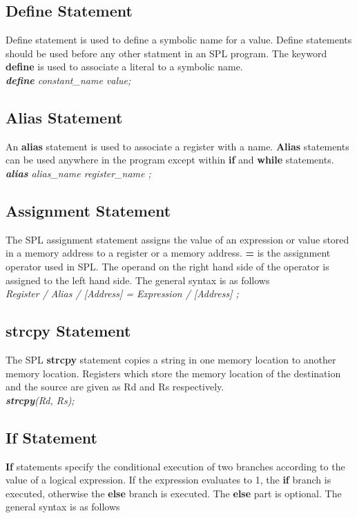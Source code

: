 \documentclass[11pt]{article}
\begin{document}
\subsection{Define Statement}
Define statement is used to define a symbolic name for a value. Define statements should be  used before any other statment in an SPL program. The keyword \textbf{define} is used to associate a literal to a symbolic name. \\

\textit{ \textbf{define} constant\_name value; }


\subsection{Alias Statement}
An \textbf{alias} statement is used to  associate a register with a name. \textbf{Alias} statements can be used anywhere in the program except within \textbf{if} and \textbf{while} statements.\\

\indent \textit{ \textbf{alias}  alias\_name register\_name ;} \\


\subsection{Assignment Statement}
The SPL assignment statement assigns the value of an  expression or value stored in a memory address to a register or a memory address. \textbf{=} is the assignment operator used in SPL. The operand on the right hand side of the operator is assigned to the left hand side. The general syntax is as follows \\

\indent \textit{ Register / Alias / [Address] = Expression / [Address] ;}

\subsection{strcpy Statement}
The SPL \textbf{strcpy} statement copies a string in one memory location to another memory location. Registers which store the  memory location of the destination and the source are given as R{\tiny d} and R{\tiny s} respectively.\\
\indent \textit{ \textbf{strcpy}(R{\tiny d}, R{\tiny s});}

\subsection{If Statement}
\textbf{If} statements specify the conditional execution of two branches according to the value of a logical expression. If the expression evaluates to 1, the \textbf{if} branch is executed, otherwise the \textbf{else}  branch is executed. The \textbf{else} part is optional. The general syntax is as follows  \\
\end{document}
